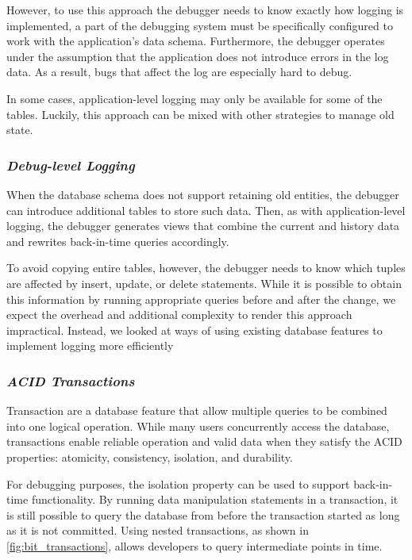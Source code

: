 However, to use this approach the debugger needs to know exactly how logging is implemented, \ie a part of the debugging system must be specifically configured to work with the application's data schema.
Furthermore, the debugger operates under the assumption that the application does not introduce errors in the log data.
As a result, bugs that affect the log are especially hard to debug.

In some cases, application-level logging may only be available for some of the tables.
Luckily, this approach can be mixed with other strategies to manage old state.

\subsubsection*{\emph{Debug-level Logging}}

When the database schema does not support retaining old entities, the debugger can introduce additional tables to store such data.
Then, as with application-level logging, the debugger generates views that combine the current and history data and rewrites back-in-time queries accordingly.

To avoid copying entire tables, however, the debugger needs to know which tuples are affected by insert, update, or delete statements.
While it is possible to obtain this information by running appropriate queries before and after the change, we expect the overhead and additional complexity to render this approach impractical.
Instead, we looked at ways of using existing database features to implement logging more efficiently

\subsubsection*{\emph{ACID Transactions}}

Transaction are a database feature that allow multiple queries to be combined into one logical operation.
While many users concurrently access the database, transactions enable reliable operation and valid data when they satisfy the ACID properties: atomicity, consistency, isolation, and durability.

For debugging purposes, the isolation property can be used to support back-in-time functionality.
By running data manipulation statements in a transaction, it is still possible to query the database from before the transaction started as long as it is not committed.
Using nested transactions, as shown in \cref{fig:bit_transactions}, allows developers to query intermediate points in time.

